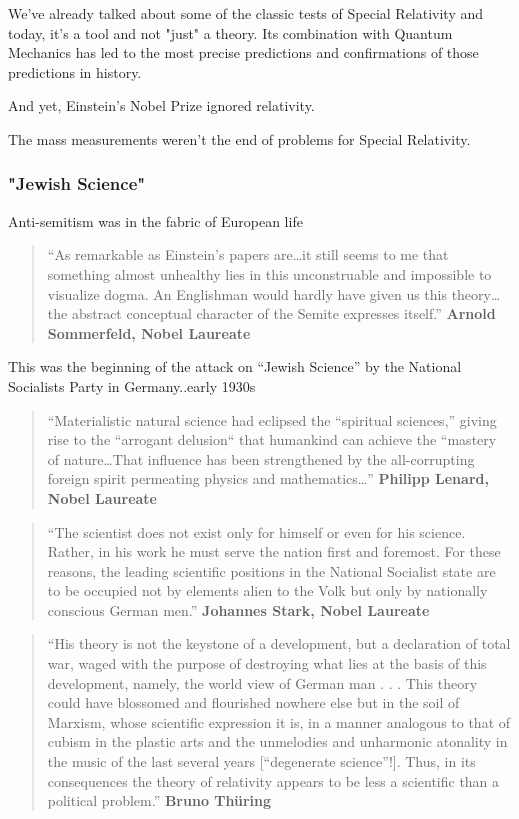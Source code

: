 \documentclass[
]{article}
\begin{document}
We've already talked about some of the classic tests of Special
Relativity and today, it's a tool and not "just" a theory. Its
combination with Quantum Mechanics has led to the most precise
predictions and confirmations of those predictions in history.

And yet, Einstein's Nobel Prize ignored relativity.

The mass measurements weren't the end of problems for Special
Relativity.

\hypertarget{jewish-science}{%
\subsubsection{"Jewish Science"}\label{jewish-science}}

Anti-semitism was in the fabric of European life

\begin{quote}
``As remarkable as Einstein's papers are\ldots it still seems to me that
something almost unhealthy lies in this unconstruable and impossible to
visualize dogma. An Englishman would hardly have given us this
theory\ldots{} the abstract conceptual character of the Semite expresses
itself.'' \textbf{Arnold Sommerfeld, Nobel Laureate}
\end{quote}

This was the beginning of the attack on ``Jewish Science'' by the
National Socialists Party in Germany..early 1930s

\begin{quote}
``Materialistic natural science had eclipsed the ``spiritual sciences,''
giving rise to the ``arrogant delusion`` that humankind can achieve the
``mastery of nature\ldots That influence has been strengthened by the
all-corrupting foreign spirit permeating physics and mathematics\ldots''
\textbf{Philipp Lenard, Nobel Laureate}
\end{quote}

\begin{quote}
``The scientist does not exist only for himself or even for his science.
Rather, in his work he must serve the nation first and foremost. For
these reasons, the leading scientific positions in the National
Socialist state are to be occupied not by elements alien to the Volk but
only by nationally conscious German men.'' \textbf{Johannes Stark, Nobel
Laureate}
\end{quote}

\begin{quote}
``His theory is not the keystone of a development, but a declaration of
total war, waged with the purpose of destroying what lies at the basis
of this development, namely, the world view of German man . . . This
theory could have blossomed and flourished nowhere else but in the soil
of Marxism, whose scientific expression it is, in a manner analogous to
that of cubism in the plastic arts and the unmelodies and unharmonic
atonality in the music of the last several years {[}``degenerate
science''!{]}. Thus, in its consequences the theory of relativity
appears to be less a scientific than a political problem.''
\textbf{Bruno Thüring}
\end{quote}
\end{document}
